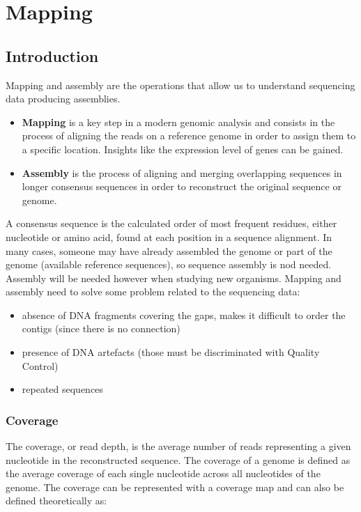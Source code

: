 \graphicspath{{chapters/images/05/}}
\chapter{Mapping}

\section{Introduction}
Mapping and assembly are the operations that allow us to understand sequencing data producing assemblies.

\begin{multicols}{2}
    \begin{itemize}
        \item \textbf{Mapping} is a key step in a modern genomic analysis and consists in the process of aligning the reads on a reference genome in order to assign them to a specific location.
            Insights like the expression level of genes can be gained.
        \item \textbf{Assembly} is the process of aligning and merging overlapping sequences in longer consensus sequences in order to reconstruct the original sequence or genome.
    \end{itemize}
\end{multicols}

A consensus sequence is the calculated order of most frequent residues, either nucleotide or amino acid, found at each position in a sequence alignment.
In many cases, someone may have already assembled the genome or part of the genome (available reference sequences), so sequence assembly is nod needed.
Assembly will be needed however when studying new organisms.
Mapping and assembly need to solve some problem related to the sequencing data:

\begin{multicols}{2}
    \begin{itemize}
        \item absence of DNA fragments covering the gaps, makes it difficult to order the contigs (since there is no connection)
        \item presence of DNA artefacts (those must be discriminated with Quality Control)
        \item repeated sequences
    \end{itemize}
\end{multicols}

    \subsection{Coverage}
    The coverage, or read depth, is the average number of reads representing a given nucleotide in the reconstructed sequence.
    The coverage of a genome is defined as the average coverage of each single nucleotide across all nucleotides of the genome.
    The coverage can be represented with a coverage map and can also be defined theoretically as:

